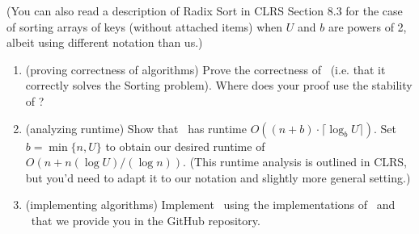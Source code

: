 \documentclass[11pt]{article}
\begin{document}
\begin{enumerate}
(You can also read a description of Radix Sort in CLRS Section 8.3 for the case of sorting arrays of keys (without attached items) when $U$ and $b$ are powers of 2, albeit using different notation than us.)

        \begin{enumerate}
        
            \item (proving correctness of algorithms) Prove the correctness of \RadixSort\ (i.e. that it correctly solves the Sorting problem).  Where does your proof use the stability of \CountingSort?
      
            
            \item (analyzing runtime) Show that \RadixSort\ has runtime $O((n+b)\cdot \lceil \log_b U\rceil)$.  Set $b=\min\{n,U\}$ to obtain our desired runtime of $O(n+n(\log U)/(\log n))$.  (This runtime analysis is outlined in CLRS, but you'd need to adapt it to our notation and slightly more general setting.) 
            
            \item (implementing algorithms)
            Implement \RadixSort\ using the implementations of \CountingSort\ and \BC\ that we provide you in the GitHub repository. 
  

\end{enumerate}
\end{enumerate}
\end{document}
